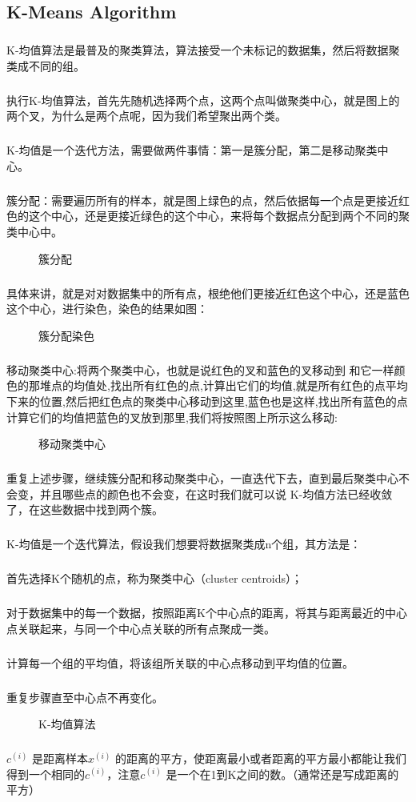 \documentclass{article}
\begin{document}
\begin{CJK}{UTF8}{gbsn}
\subsection{K-Means Algorithm}
\subparagraph{}
K-均值算法是最普及的聚类算法，算法接受一个未标记的数据集，然后将数据聚类成不同的组。
\subparagraph{}
执行K-均值算法，首先先随机选择两个点，这两个点叫做聚类中心，就是图上的两个叉，为什么是两个点呢，因为我们希望聚出两个类。
\subparagraph{}
K-均值是一个迭代方法，需要做两件事情：第一是簇分配，第二是移动聚类中心。
\subparagraph{}
簇分配：需要遍历所有的样本，就是图上绿色的点，然后依据每一个点是更接近红色的这个中心，还是更接近绿色的这个中心，来将每个数据点分配到两个不同的聚类中心中。
\begin{figure}[H]
\label{fig:806}
\caption{簇分配}
\end{figure}
\subparagraph{}
具体来讲，就是对对数据集中的所有点，根绝他们更接近红色这个中心，还是蓝色这个中心，进行染色，染色的结果如图：
\begin{figure}[H]
\label{fig:807}
\caption{簇分配染色}
\end{figure}
\subparagraph{}
移动聚类中心:将两个聚类中心，也就是说红色的叉和蓝色的叉移动到 和它一样颜色的那堆点的均值处,找出所有红色的点,计算出它们的均值,就是所有红色的点平均下来的位置,然后把红色点的聚类中心移动到这里,蓝色也是这样,找出所有蓝色的点计算它们的均值把蓝色的叉放到那里,我们将按照图上所示这么移动:
\begin{figure}[H]
\label{fig:808}
\caption{移动聚类中心}
\end{figure}
\subparagraph{}
重复上述步骤，继续簇分配和移动聚类中心，一直迭代下去，直到最后聚类中心不会变，并且哪些点的颜色也不会变，在这时我们就可以说 K-均值方法已经收敛了，在这些数据中找到两个簇。
\subparagraph{}
K-均值是一个迭代算法，假设我们想要将数据聚类成n个组，其方法是：
\subparagraph{}
首先选择K个随机的点，称为聚类中心（cluster centroids）；
\subparagraph{}
对于数据集中的每一个数据，按照距离K个中心点的距离，将其与距离最近的中心点关联起来，与同一个中心点关联的所有点聚成一类。
\subparagraph{}
计算每一个组的平均值，将该组所关联的中心点移动到平均值的位置。
\subparagraph{}
重复步骤直至中心点不再变化。
\begin{figure}[H]
\label{fig:809}
\caption{K-均值算法}
\end{figure}
\subparagraph{}
$c^{(i)}$ 是距离样本$x^{(i)}$ 的距离的平方，使距离最小或者距离的平方最小都能让我们得到一个相同的$c^{(i)}$，注意$c^{(i)}$ 是一个在1到K之间的数。（通常还是写成距离的平方）

\end{CJK}
\end{document}
